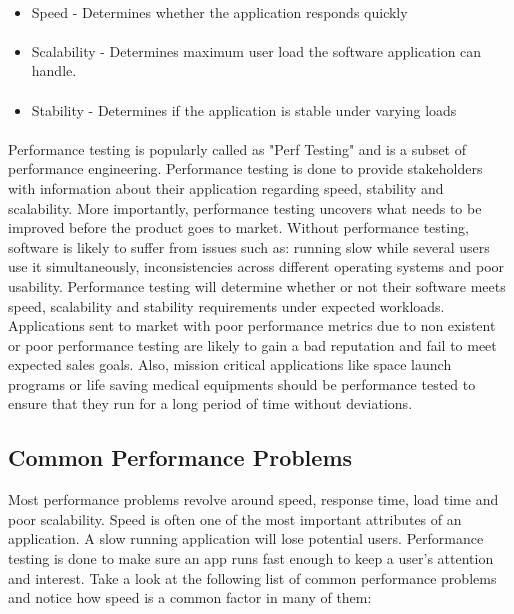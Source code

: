 \documentclass[../thesis.tex]{subfiles}
\begin{document}
\paragraph{}
\begin{itemize}
\item Speed - Determines whether the application responds quickly
\paragraph{}
\item Scalability - Determines maximum user load the software application can handle.
\paragraph{}
\item Stability - Determines if the application is stable under varying loads
\end{itemize}
\paragraph{}
Performance testing is popularly called as "Perf Testing" and is a subset of performance engineering. Performance testing is done to provide stakeholders with information about their application regarding speed, stability and scalability. More importantly, performance testing uncovers what needs to be improved before the product goes to market. Without performance testing, software is likely to suffer from issues such as: running slow while several users use it simultaneously, inconsistencies across different operating systems and poor usability. Performance testing will determine whether or not their software meets speed, scalability and stability requirements under expected workloads. Applications sent to market with poor performance metrics due to non existent or poor performance testing are likely to gain a bad reputation and fail to meet expected sales goals. Also, mission critical applications like space launch programs or life saving medical equipments should be performance tested to ensure that they run for a long period of time without deviations.
\subsection*{Common Performance Problems}
Most performance problems revolve around speed, response time, load time and poor scalability. Speed is often one of the most important attributes of an application. A slow running application will lose potential users. Performance testing is done to make sure an app runs fast enough to keep a user's attention and interest. Take a look at the following list of common performance problems and notice how speed is a common factor in many of them:
\end{document}
